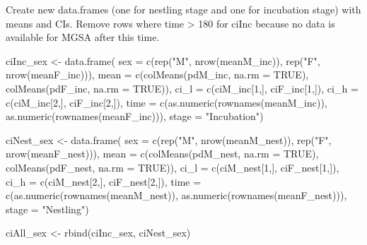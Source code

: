 \documentclass[
]{article}
\newenvironment{Shaded}{\begin{snugshade}}{\end{snugshade}}
\newcommand{\AttributeTok}[1]{\textcolor[rgb]{0.77,0.63,0.00}{#1}}
\newcommand{\ConstantTok}[1]{\textcolor[rgb]{0.00,0.00,0.00}{#1}}
\newcommand{\DecValTok}[1]{\textcolor[rgb]{0.00,0.00,0.81}{#1}}
\newcommand{\FunctionTok}[1]{\textcolor[rgb]{0.00,0.00,0.00}{#1}}
\newcommand{\NormalTok}[1]{#1}
\newcommand{\OtherTok}[1]{\textcolor[rgb]{0.56,0.35,0.01}{#1}}
\newcommand{\StringTok}[1]{\textcolor[rgb]{0.31,0.60,0.02}{#1}}
\begin{document}
Create new data.frames (one for nestling stage and one for incubation
stage) with means and CIs. Remove rows where time \textgreater{} 180 for
ciInc because no data is available for MGSA after this time.

\begin{Shaded}
\begin{Highlighting}[]
\NormalTok{ciInc\_sex }\OtherTok{\textless{}{-}} \FunctionTok{data.frame}\NormalTok{(}
    \AttributeTok{sex =} \FunctionTok{c}\NormalTok{(}\FunctionTok{rep}\NormalTok{(}\StringTok{"M"}\NormalTok{, }\FunctionTok{nrow}\NormalTok{(meanM\_inc)), }\FunctionTok{rep}\NormalTok{(}\StringTok{"F"}\NormalTok{, }\FunctionTok{nrow}\NormalTok{(meanF\_inc))),}
    \AttributeTok{mean =} \FunctionTok{c}\NormalTok{(}\FunctionTok{colMeans}\NormalTok{(pdM\_inc, }\AttributeTok{na.rm =} \ConstantTok{TRUE}\NormalTok{), }\FunctionTok{colMeans}\NormalTok{(pdF\_inc, }\AttributeTok{na.rm =} \ConstantTok{TRUE}\NormalTok{)),}
    \AttributeTok{ci\_l =} \FunctionTok{c}\NormalTok{(ciM\_inc[}\DecValTok{1}\NormalTok{,], ciF\_inc[}\DecValTok{1}\NormalTok{,]),}
    \AttributeTok{ci\_h =} \FunctionTok{c}\NormalTok{(ciM\_inc[}\DecValTok{2}\NormalTok{,], ciF\_inc[}\DecValTok{2}\NormalTok{,]),}
    \AttributeTok{time =} \FunctionTok{c}\NormalTok{(}\FunctionTok{as.numeric}\NormalTok{(}\FunctionTok{rownames}\NormalTok{(meanM\_inc)), }\FunctionTok{as.numeric}\NormalTok{(}\FunctionTok{rownames}\NormalTok{(meanF\_inc))),}
    \AttributeTok{stage =} \StringTok{"Incubation"}\NormalTok{)}


\NormalTok{ciNest\_sex }\OtherTok{\textless{}{-}} \FunctionTok{data.frame}\NormalTok{(}
    \AttributeTok{sex =} \FunctionTok{c}\NormalTok{(}\FunctionTok{rep}\NormalTok{(}\StringTok{"M"}\NormalTok{, }\FunctionTok{nrow}\NormalTok{(meanM\_nest)), }\FunctionTok{rep}\NormalTok{(}\StringTok{"F"}\NormalTok{, }\FunctionTok{nrow}\NormalTok{(meanF\_nest))),}
    \AttributeTok{mean =} \FunctionTok{c}\NormalTok{(}\FunctionTok{colMeans}\NormalTok{(pdM\_nest, }\AttributeTok{na.rm =} \ConstantTok{TRUE}\NormalTok{), }\FunctionTok{colMeans}\NormalTok{(pdF\_nest, }\AttributeTok{na.rm =} \ConstantTok{TRUE}\NormalTok{)),}
    \AttributeTok{ci\_l =} \FunctionTok{c}\NormalTok{(ciM\_nest[}\DecValTok{1}\NormalTok{,], ciF\_nest[}\DecValTok{1}\NormalTok{,]),}
    \AttributeTok{ci\_h =} \FunctionTok{c}\NormalTok{(ciM\_nest[}\DecValTok{2}\NormalTok{,], ciF\_nest[}\DecValTok{2}\NormalTok{,]),}
    \AttributeTok{time =} \FunctionTok{c}\NormalTok{(}\FunctionTok{as.numeric}\NormalTok{(}\FunctionTok{rownames}\NormalTok{(meanM\_nest)), }\FunctionTok{as.numeric}\NormalTok{(}\FunctionTok{rownames}\NormalTok{(meanF\_nest))),}
    \AttributeTok{stage =} \StringTok{"Nestling"}\NormalTok{)}
    
\NormalTok{ciAll\_sex }\OtherTok{\textless{}{-}} \FunctionTok{rbind}\NormalTok{(ciInc\_sex, ciNest\_sex)}
\end{Highlighting}
\end{Shaded}
\end{document}
